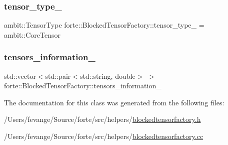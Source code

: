 \mbox{\label{classforte_1_1_blocked_tensor_factory_a57b7de17cd536996e3ad6dc2e4bc98cd}} 
\subsubsection{\texorpdfstring{tensor\+\_\+type\+\_\+}{tensor\_type\_}}
{\footnotesize\ttfamily ambit\+::\+Tensor\+Type forte\+::\+Blocked\+Tensor\+Factory\+::tensor\+\_\+type\+\_\+ = ambit\+::\+Core\+Tensor\hspace{0.3cm}{\ttfamily [protected]}}

\mbox{\label{classforte_1_1_blocked_tensor_factory_a9718510c80ab928097b1db00bc042363}} 
\subsubsection{\texorpdfstring{tensors\+\_\+information\+\_\+}{tensors\_information\_}}
{\footnotesize\ttfamily std\+::vector$<$std\+::pair$<$std\+::string, double$>$ $>$ forte\+::\+Blocked\+Tensor\+Factory\+::tensors\+\_\+information\+\_\+\hspace{0.3cm}{\ttfamily [protected]}}



The documentation for this class was generated from the following files\+:\begin{DoxyCompactItemize}
\item 
/\+Users/fevange/\+Source/forte/src/helpers/\mbox{\hyperlink{blockedtensorfactory_8h}{blockedtensorfactory.\+h}}\item 
/\+Users/fevange/\+Source/forte/src/helpers/\mbox{\hyperlink{blockedtensorfactory_8cc}{blockedtensorfactory.\+cc}}\end{DoxyCompactItemize}

